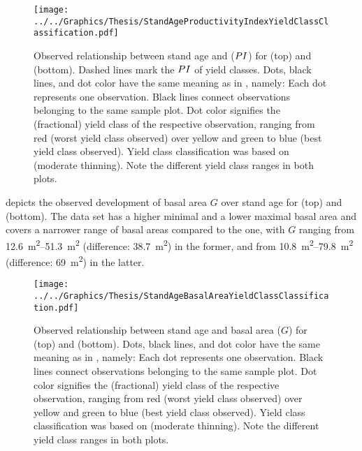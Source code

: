 \begin{figure}[t]
  \texttt{[image: ../../Graphics/Thesis/StandAgeProductivityIndexYieldClassClassification.pdf]}
  \caption{Observed relationship between stand age and \ProductivityIndexText{} (\(PI{}\)) for \Beech{} (top) and \Spruce{} (bottom).  Dashed lines mark the \(PI{}\) of yield classes.  Dots, black lines, and dot color have the same meaning as in , namely:  Each dot represents one observation.  Black lines connect observations belonging to the same sample plot.  Dot color signifies the (fractional) yield class of the respective observation, ranging from red (worst yield class observed) over yellow and green to blue (best yield class observed). Yield class classification was based on \textcite{Schober1995} (moderate thinning).  Note the different yield class ranges in both plots.}
  \label{fig:StandAgeProductivityIndexYieldClassClassification}
\end{figure}

 depicts the observed development of basal area \(G\) over stand age for \Beech{} (top) and \Spruce{} (bottom).
The \Beech{} data set has a higher minimal and a lower maximal basal area and covers a narrower range of basal areas compared to the \Spruce{} one, with \(G\) ranging from \SIrange{12.6}{51.3}{\square\meter} (difference: \SI{38.7}{\square\meter}) in the former, and from \SIrange{10.8}{79.8}{\square\meter} (difference: \SI{69}{\square\meter}) in the latter.

\begin{figure}[t]
  \texttt{[image: ../../Graphics/Thesis/StandAgeBasalAreaYieldClassClassification.pdf]}
  \caption{Observed relationship between stand age and basal area (\(G\)) for \Beech{} (top) and \Spruce{} (bottom).  Dots, black lines, and dot color have the same meaning as in , namely:  Each dot represents one observation.  Black lines connect observations belonging to the same sample plot.  Dot color signifies the (fractional) yield class of the respective observation, ranging from red (worst yield class observed) over yellow and green to blue (best yield class observed). Yield class classification was based on \textcite{Schober1995} (moderate thinning).  Note the different yield class ranges in both plots.}
  \label{fig:StandAgeBasalAreaYieldClassClassification}
\end{figure}

